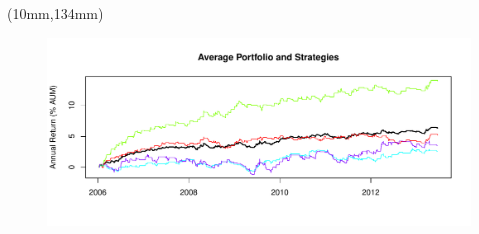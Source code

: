 \documentclass[nohyper,justified]{tufte-handout}\usepackage{graphicx, color}
\makeatletter
\def\maxwidth{ %
  \ifdim\Gin@nat@width>\linewidth
    \linewidth
  \else
    \Gin@nat@width
  \fi
}
\newenvironment{knitrout}{}{} %
\makeatother
\begin{document}
\begin{textblock*}{95mm}(10mm,134mm)
\begin{figure}
\vspace{0pt}
\begin{knitrout}
\color{fgcolor}
\includegraphics[width=\maxwidth]{figure/Performance2} 

\end{knitrout}

\end{figure}
\end{textblock*}
\end{document}
